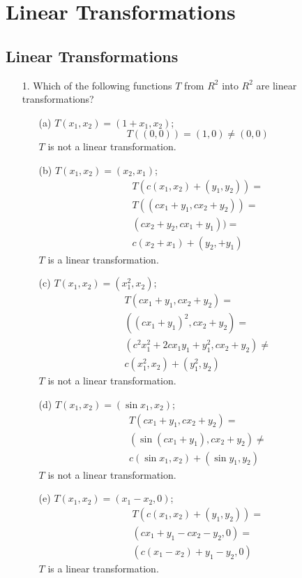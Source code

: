 \documentclass{article}
\begin{document}
\setcounter{section}{2}
\section{Linear Transformations}

\subsection{Linear Transformations}
\begin{enumerate}[listparindent=\parindent]
\item[1.] Which of the following functions \(T\) from \(R^2\) into \(R^2\) are linear transformations?
    \begin{enumerate}[listparindent=\parindent]
        \item[(a)] \(T(x_1, x_2) = (1 + x_1, x_2)\);
            \[
                T((0, 0)) = (1, 0) \neq (0, 0)
            \]
            \(T\) is not a linear transformation.
        \item[(b)] \(T(x_1, x_2) = (x_2, x_1)\);
            \begin{gather*}
                T(c(x_1, x_2) + (y_1, y_2)) = \\
                T((cx_1 + y_1, cx_2 + y_2)) = \\
                (cx_2 + y_2, cx_1 + y_1)) = \\
                c(x_2 + x_1) + (y_2, + y_1)
            \end{gather*}
            \(T\) is a linear transformation.
        \item[(c)] \(T(x_1, x_2) = (x_1^2, x_2)\);
            \begin{gather*}
                T(cx_1 + y_1, cx_2 + y_2) = \\
                ((cx_1 + y_1)^2, cx_2 + y_2) = \\
                (c^2x_1^2 + 2cx_1y_1 + y_1^2, cx_2 + y_2) \neq \\
                c(x_1^2, x_2) + (y_1^2, y_2)
            \end{gather*}
            \(T\) is not a linear transformation.
        \item[(d)] \(T(x_1, x_2) = (\sin x_1, x_2)\);
            \begin{gather*}
                T(cx_1 + y_1, cx_2 + y_2) = \\
                (\sin(cx_1 + y_1), cx_2 + y_2) \neq \\
                c(\sin x_1, x_2) + (\sin y_1, y_2)
            \end{gather*}
            \(T\) is not a linear transformation.
        \item[(e)] \(T(x_1, x_2) = (x_1 - x_2, 0)\);
            \begin{gather*}
                T(c(x_1, x_2) + (y_1, y_2)) = \\
                (cx_1 + y_1 - cx_2 - y_2, 0) = \\
                (c(x_1 - x_2) + y_1 - y_2, 0)
            \end{gather*}
            \(T\) is a linear transformation.
    \end{enumerate}


\end{enumerate}
\end{document}
